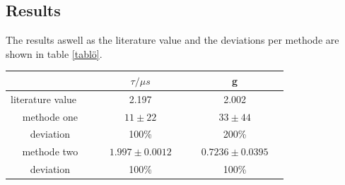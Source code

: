 \documentclass{include/thesisclass3}
\begin{document}
\subsection{Results}
The results aswell as the literature value and the deviations per methode are shown in table \ref{tablö}.\\
\begin{center}
\begin{tabular}{c|c|c}
 & $\tau /\mu s$ & g \\ 
\hline 
literature value $\quad$& 2.197 & 2.002 \\ 
\hline 
methode one & $11 \pm 22$ & $33 \pm 44$ \\ 
\hline 
deviation & 100\% & 200\% \\ 
\hline 
methode two & $\quad 1.997 \pm 0.0012 \quad$ & $\quad 0.7236 \pm 0.0395 \quad$ \\ 
\hline 
deviation & 100\% & 100\%  
\label{tablö}
\end{tabular} 
\end{center}

\end{document}
